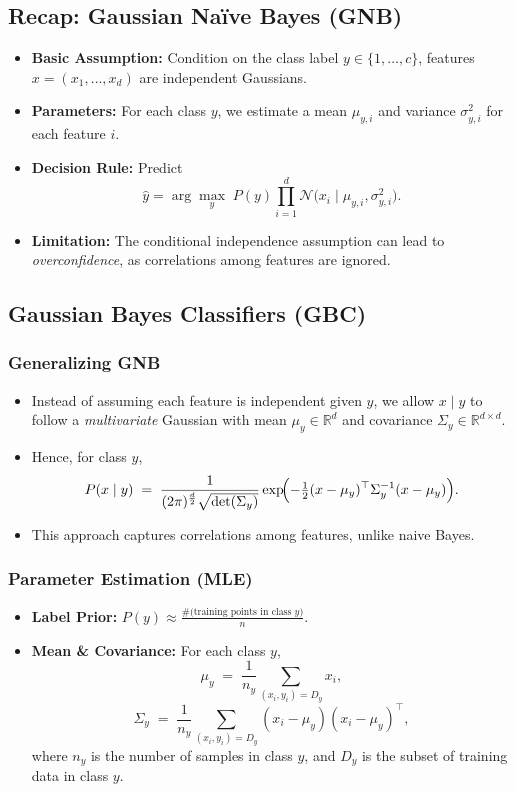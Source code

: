 \documentclass[twocolumn]{article}
\begin{document}
\begin{spacing}{1}
\subsection{Recap: Gaussian Na\"ive Bayes (GNB)}
\begin{itemize}
    \item \textbf{Basic Assumption:} Condition on the class label $y \in \{1,\dots,c\}$, features $x = (x_1,\ldots,x_d)$ are independent Gaussians.
    \item \textbf{Parameters:} For each class $y$, we estimate a mean $\mu_{y,i}$ and variance $\sigma_{y,i}^2$ for each feature $i$.
    \item \textbf{Decision Rule:} Predict 
    \[
        \hat{y} 
        = \arg\max_{y}\; P(y)\prod_{i=1}^d \mathcal{N}\bigl(x_i \mid \mu_{y,i}, \sigma_{y,i}^2\bigr).
    \]
    \item \textbf{Limitation:} The conditional independence assumption can lead to \emph{overconfidence}, as correlations among features are ignored.
\end{itemize}

\subsection{Gaussian Bayes Classifiers (GBC)}
\subsubsection{Generalizing GNB}
\begin{itemize}
    \item Instead of assuming each feature is independent given $y$, we allow $x \mid y$ to follow a \emph{multivariate} Gaussian with mean $\mu_y \in \mathbb{R}^d$ and covariance $\Sigma_y \in \mathbb{R}^{d \times d}$.
    \item Hence, for class $y$,
    \[
        P(x \mid y) 
        \;=\;
        \frac{1}{(2\pi)^{\frac{d}{2}} \sqrt{\det(\Sigma_y)}}
        \exp\!\Bigl(-\tfrac12 (x - \mu_y)^\top \Sigma_y^{-1} (x - \mu_y)\Bigr).
    \]
    \item This approach captures correlations among features, unlike naive Bayes.
\end{itemize}

\subsubsection{Parameter Estimation (MLE)}
\begin{itemize}
    \item \textbf{Label Prior:} $P(y) \approx \tfrac{\text{\#(training points in class }y)}{n}$.
    \item \textbf{Mean \& Covariance:} For each class $y$,
    \[
        \mu_y \;=\; \frac{1}{n_y} \sum_{(x_i,y_i)=D_y} x_i, 
    \]
    \[
        \Sigma_y \;=\; \frac{1}{n_y} \sum_{(x_i,y_i)=D_y} (x_i - \mu_y)(x_i - \mu_y)^\top,
    \]
    where $n_y$ is the number of samples in class $y$, and $D_y$ is the subset of training data in class $y$.
\end{itemize}


\end{spacing}
\end{document}
